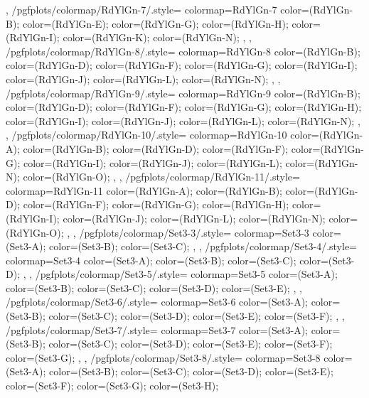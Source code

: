 {{  },
  /pgfplots/colormap/RdYlGn-7/.style={
    colormap={RdYlGn-7}{
      color=(RdYlGn-B);
      color=(RdYlGn-E);
      color=(RdYlGn-G);
      color=(RdYlGn-H);
      color=(RdYlGn-I);
      color=(RdYlGn-K);
      color=(RdYlGn-N);
    },
  },
  /pgfplots/colormap/RdYlGn-8/.style={
    colormap={RdYlGn-8}{
      color=(RdYlGn-B);
      color=(RdYlGn-D);
      color=(RdYlGn-F);
      color=(RdYlGn-G);
      color=(RdYlGn-I);
      color=(RdYlGn-J);
      color=(RdYlGn-L);
      color=(RdYlGn-N);
    },
  },
  /pgfplots/colormap/RdYlGn-9/.style={
    colormap={RdYlGn-9}{
      color=(RdYlGn-B);
      color=(RdYlGn-D);
      color=(RdYlGn-F);
      color=(RdYlGn-G);
      color=(RdYlGn-H);
      color=(RdYlGn-I);
      color=(RdYlGn-J);
      color=(RdYlGn-L);
      color=(RdYlGn-N);
    },
  },
  /pgfplots/colormap/RdYlGn-10/.style={
    colormap={RdYlGn-10}{
      color=(RdYlGn-A);
      color=(RdYlGn-B);
      color=(RdYlGn-D);
      color=(RdYlGn-F);
      color=(RdYlGn-G);
      color=(RdYlGn-I);
      color=(RdYlGn-J);
      color=(RdYlGn-L);
      color=(RdYlGn-N);
      color=(RdYlGn-O);
    },
  },
  /pgfplots/colormap/RdYlGn-11/.style={
    colormap={RdYlGn-11}{
      color=(RdYlGn-A);
      color=(RdYlGn-B);
      color=(RdYlGn-D);
      color=(RdYlGn-F);
      color=(RdYlGn-G);
      color=(RdYlGn-H);
      color=(RdYlGn-I);
      color=(RdYlGn-J);
      color=(RdYlGn-L);
      color=(RdYlGn-N);
      color=(RdYlGn-O);
    },
  },
  /pgfplots/colormap/Set3-3/.style={
    colormap={Set3-3}{
      color=(Set3-A);
      color=(Set3-B);
      color=(Set3-C);
    },
  },
  /pgfplots/colormap/Set3-4/.style={
    colormap={Set3-4}{
      color=(Set3-A);
      color=(Set3-B);
      color=(Set3-C);
      color=(Set3-D);
    },
  },
  /pgfplots/colormap/Set3-5/.style={
    colormap={Set3-5}{
      color=(Set3-A);
      color=(Set3-B);
      color=(Set3-C);
      color=(Set3-D);
      color=(Set3-E);
    },
  },
  /pgfplots/colormap/Set3-6/.style={
    colormap={Set3-6}{
      color=(Set3-A);
      color=(Set3-B);
      color=(Set3-C);
      color=(Set3-D);
      color=(Set3-E);
      color=(Set3-F);
    },
  },
  /pgfplots/colormap/Set3-7/.style={
    colormap={Set3-7}{
      color=(Set3-A);
      color=(Set3-B);
      color=(Set3-C);
      color=(Set3-D);
      color=(Set3-E);
      color=(Set3-F);
      color=(Set3-G);
    },
  },
  /pgfplots/colormap/Set3-8/.style={
    colormap={Set3-8}{
      color=(Set3-A);
      color=(Set3-B);
      color=(Set3-C);
      color=(Set3-D);
      color=(Set3-E);
      color=(Set3-F);
      color=(Set3-G);
      color=(Set3-H);
}}}

